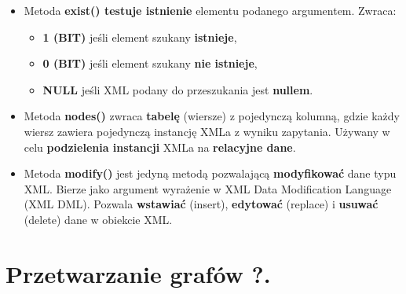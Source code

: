 \documentclass[a4paper]{article}
\begin{document}
\begin{itemize}
        \item Metoda \textbf{exist() testuje istnienie} elementu podanego argumentem. Zwraca:
        \begin{itemize}
            \item \textbf{1 (BIT)} jeśli element szukany \textbf{istnieje},
            \item \textbf{0 (BIT)} jeśli element szukany \textbf{nie istnieje},
            \item \textbf{NULL} jeśli XML podany do przeszukania jest \textbf{nullem}.
        \end{itemize}
        \item Metoda \textbf{nodes()} zwraca \textbf{tabelę} (wiersze) z pojedynczą kolumną, gdzie każdy wiersz zawiera pojedynczą instancję XMLa z wyniku zapytania. Używany w celu \textbf{podzielenia instancji} XMLa na \textbf{relacyjne dane}.
        \item Metoda \textbf{modify()} jest jedyną metodą pozwalającą \textbf{modyfikować} dane typu XML. Bierze jako argument wyrażenie w XML Data Modification Language (XML DML). Pozwala \textbf{wstawiać} (insert), \textbf{edytować} (replace) i \textbf{usuwać} (delete) dane w obiekcie XML.
    \end{itemize}


    \section{Przetwarzanie grafów ?.}
\end{document}
